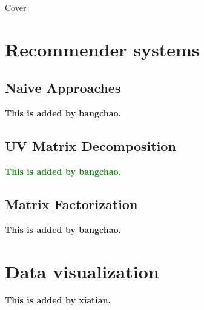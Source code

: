 \documentclass[12pt]{article}
\begin{document}
\thispagestyle{empty}
\begin{center}
\Huge    Cover
\end{center}

\newpage
\thispagestyle{empty}
\tableofcontents

\newpage
\section{Recommender systems}
\subsection{Naive Approaches}
\textbf{This is added by bangchao.}

\subsection{UV Matrix Decomposition}
\textcolor{green}{\textbf{This is added by bangchao.}}
\subsection{Matrix Factorization}
\textbf{This is added by bangchao.}
\section{Data visualization}

\textbf{This is added by xiatian.}
\end{document}
